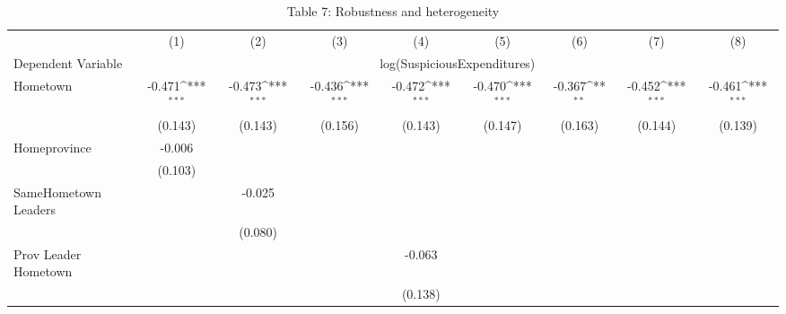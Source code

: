 \begin{table}[p]\centering\captionsetup{width=\textwidth,labelformat=empty}\begin{threeparttable}\footnotesize{
\def\sym#1{\ifmmode^{#1}\else\(^{#1}\)\fi}
\caption{Table 7: Robustness and heterogeneity}
\begin{tabular}{l*{8}{c}}
\hline\hline
                    &\multicolumn{1}{c}{(1)}         &\multicolumn{1}{c}{(2)}         &\multicolumn{1}{c}{(3)}         &\multicolumn{1}{c}{(4)}         &\multicolumn{1}{c}{(5)}         &\multicolumn{1}{c}{(6)}         &\multicolumn{1}{c}{(7)}         &\multicolumn{1}{c}{(8)}         \\
Dependent Variable & \multicolumn{8}{c}{log(SuspiciousExpenditures)} \\ 
\hline
Hometown            &      -0.471\sym{***}&      -0.473\sym{***}&      -0.436\sym{***}&      -0.472\sym{***}&      -0.470\sym{***}&      -0.367\sym{**} &      -0.452\sym{***}&      -0.461\sym{***}\\
                    &     (0.143)         &     (0.143)         &     (0.156)         &     (0.143)         &     (0.147)         &     (0.163)         &     (0.144)         &     (0.139)         \\
Homeprovince        &      -0.006         &                     &                     &                     &                     &                     &                     &                     \\
                    &     (0.103)         &                     &                     &                     &                     &                     &                     &                     \\
SameHometown Leaders&                     &      -0.025         &                     &                     &                     &                     &                     &                     \\
                    &                     &     (0.080)         &                     &                     &                     &                     &                     &                     \\
Prov Leader Hometown&                     &                     &                     &      -0.063         &                     &                     &                     &                     \\
                    &                     &                     &                     &     (0.138)         &                     &                     &                     &                     \\

\end{tabular}}
\end{threeparttable}
\end{table}
